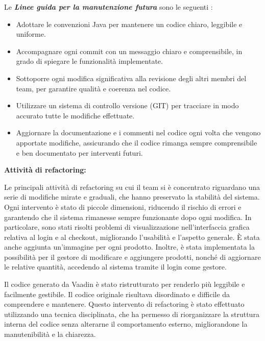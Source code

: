 \documentclass[a4paper,12pt]{article}
\begin{document}
Le \textbf{\textit{Linee guida per la manutenzione futura}} sono le seguenti : 
\begin{itemize}
    \item  Adottare le convenzioni Java per mantenere un codice chiaro, leggibile e uniforme.
\end{itemize}
\begin{itemize}
    \item Accompagnare ogni commit con un messaggio chiaro e comprensibile, in grado di spiegare le funzionalità implementate.
\end{itemize}
\begin{itemize}
    \item  Sottoporre ogni modifica significativa alla revisione degli altri membri del team, per garantire qualità e coerenza nel codice.
\end{itemize}
\begin{itemize}
    \item Utilizzare un sistema di controllo versione (GIT) per tracciare in modo accurato tutte le modifiche effettuate.
\end{itemize}
\begin{itemize}
    \item Aggiornare la documentazione e i commenti nel codice ogni volta che vengono apportate modifiche, assicurando che il codice rimanga sempre comprensibile e ben documentato per interventi futuri.
\end{itemize}

\textbf{Attività di refactoring:}

Le principali attività di refactoring su cui il team si è concentrato riguardano una serie di modifiche mirate e graduali, che hanno preservato la stabilità del sistema. Ogni intervento è stato di piccole dimensioni, riducendo il rischio di errori e garantendo che il sistema rimanesse sempre funzionante dopo ogni modifica. In particolare, sono stati risolti problemi di visualizzazione nell'interfaccia grafica relativa al login e al checkout, migliorando l'usabilità e l'aspetto generale. È stata anche aggiunta un'immagine per ogni prodotto. Inoltre, è stata implementata la possibilità per il gestore di modificare e aggiungere prodotti, nonché di aggiornare le relative quantità, accedendo al sistema tramite il login come gestore.

Il codice generato da Vaadin è stato ristrutturato per renderlo più leggibile e facilmente gestibile. Il codice originale risultava disordinato e difficile da comprendere e mantenere. Questo intervento di refactoring è stato effettuato utilizzando una tecnica disciplinata, che ha permesso di riorganizzare la struttura interna del codice senza alterarne il comportamento esterno, migliorandone la manutenibilità e la chiarezza.
\end{document}
